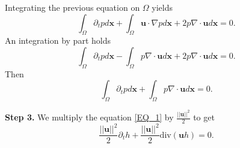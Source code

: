 \documentclass[a4paper, 11pt]{report}
\begin{document}
Integrating the previous equation on $\Omega$ yields
\begin{equation*}
\int_{\Omega}\partial_t pd\boldsymbol{x}+\int_{\Omega}\boldsymbol{u}\cdot \nabla pd\boldsymbol{x}+2p\nabla \cdot \boldsymbol{u}d\boldsymbol{x}=0.
\end{equation*}
An integration by part holds
\begin{equation*}
\int_{\Omega}\partial_t pd\boldsymbol{x}-\int_{\Omega}p\nabla \cdot \boldsymbol{u} d\boldsymbol{x}+2p\nabla \cdot \boldsymbol{u}d\boldsymbol{x}=0.
\end{equation*}
Then
\begin{equation*}
\int_{\Omega}\partial_t pd\boldsymbol{x}+\int_{\Omega}p\nabla \cdot \boldsymbol{u} d\boldsymbol{x}=0.
\end{equation*}

\textbf{Step 3.}
We multiply the equation \eqref{EQ_1} by $\frac{||\boldsymbol{u}||^2}{2}$ to get
\begin{equation*}
\frac{||\boldsymbol{u}||^2}{2}\partial_t h+\frac{||\boldsymbol{u}||^2}{2}\text{div}(\boldsymbol{u}h)=0.
\end{equation*}
\end{document}
